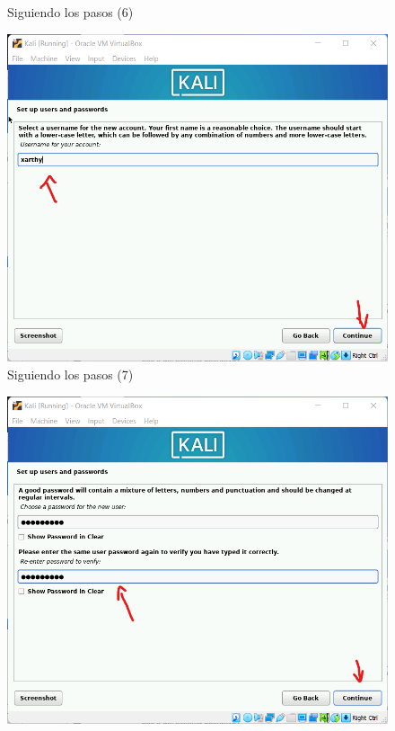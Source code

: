 \documentclass[stu, 12pt, letterpaper, donotrepeattitle, floatsintext, natbib, helv]{apa7}
\begin{document}
\begin{enumerate}
\begin{figure} [H]
        \caption{Siguiendo los pasos (6)}
        \label{fig:Inst6}
    \end{figure}
    \begin{figure} [H]
        \includegraphics[width = 1\textwidth]{Installation7.png}
        \caption{Siguiendo los pasos (7)}
        \label{fig:Inst7}
    \end{figure}
    \begin{figure} [H]
        \includegraphics[width = 1\textwidth]{Installation8.png}

\end{figure}
\end{enumerate}
\end{document}

